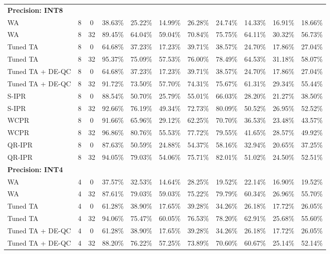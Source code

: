 \documentclass{article}
\theoremstyle{plain}
\theoremstyle{definition}
\theoremstyle{remark}
\begin{document}
\begin{table}[htbp]
\begin{center}
\begin{scriptsize}
\begin{sc}
\begin{tabular}{lcccccccccc}
\midrule
\textbf{Precision: INT8} & & & & & & & & & & \\
WA & 8 & 0 & 38.63\% & 25.22\% & 14.99\% & 26.28\% & 24.74\% & 14.33\% & 16.91\% & 18.66\% \\
WA & 8 & 32 & 89.45\% & 64.04\% & 59.04\% & 70.84\% & 75.75\% & 64.11\% & 30.32\% & 56.73\% \\
Tuned TA & 8 & 0 & 64.68\% & 37.23\% & 17.23\% & 39.71\% & 38.57\% & 24.70\% & 17.86\% & 27.04\% \\
Tuned TA & 8 & 32 & 95.37\% & 75.09\% & 57.53\% & 76.00\% & 78.49\% & 64.53\% & 31.18\% & 58.07\% \\
Tuned TA + DE-QC & 8 & 0 & 64.68\% & 37.23\% & 17.23\% & 39.71\% & 38.57\% & 24.70\% & 17.86\% & 27.04\% \\
Tuned TA + DE-QC & 8 & 32 & 91.72\% & 73.50\% & 57.70\% & 74.31\% & 75.67\% & 61.31\% & 29.34\% & 55.44\% \\
S-IPR & 8 & 0 & 88.54\% & 50.70\% & 25.79\% & 55.01\% & 66.03\% & 28.20\% & 21.27\% & 38.50\% \\
S-IPR & 8 & 32 & 92.66\% & 76.19\% & 49.34\% & 72.73\% & 80.09\% & 50.52\% & 26.95\% & 52.52\% \\
WCPR & 8 & 0 & 91.66\% & 65.96\% & 29.12\% & 62.25\% & 70.70\% & 36.53\% & 23.48\% & 43.57\% \\
WCPR & 8 & 32 & 96.86\% & 80.76\% & 55.53\% & 77.72\% & 79.55\% & 41.65\% & 28.57\% & 49.92\% \\
QR-IPR & 8 & 0 & 87.63\% & 50.59\% & 24.88\% & 54.37\% & 58.16\% & 32.94\% & 20.65\% & 37.25\% \\
QR-IPR & 8 & 32 & 94.05\% & 79.03\% & 54.06\% & 75.71\% & 82.01\% & 51.02\% & 24.50\% & 52.51\% \\
\midrule
\textbf{Precision: INT4} & & & & & & & & & & \\
WA & 4 & 0 & 37.57\% & 32.53\% & 14.64\% & 28.25\% & 19.52\% & 22.14\% & 16.90\% & 19.52\% \\
WA & 4 & 32 & 87.61\% & 79.03\% & 59.03\% & 75.22\% & 79.79\% & 60.34\% & 26.96\% & 55.70\% \\
Tuned TA & 4 & 0 & 61.28\% & 38.90\% & 17.65\% & 39.28\% & 34.26\% & 26.18\% & 17.72\% & 26.05\% \\
Tuned TA & 4 & 32 & 94.06\% & 75.47\% & 60.05\% & 76.53\% & 78.20\% & 62.91\% & 25.68\% & 55.60\% \\
Tuned TA + DE-QC & 4 & 0 & 61.28\% & 38.90\% & 17.65\% & 39.28\% & 34.26\% & 26.18\% & 17.72\% & 26.05\% \\
Tuned TA + DE-QC & 4 & 32 & 88.20\% & 76.22\% & 57.25\% & 73.89\% & 70.60\% & 60.67\% & 25.14\% & 52.14\% \\

\end{tabular}
\end{sc}
\end{scriptsize}
\end{center}
\end{table}
\end{document}
